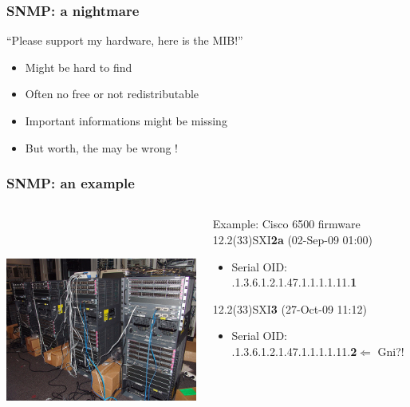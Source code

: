 \documentclass{beamer}
\begin{document}
\begin{frame}
    \frametitle{SNMP: a nightmare}

    \begin{block}{“Please support my hardware, here is the MIB!”}

    \pause
    \begin{itemize}
    \item Might be hard to find
    \item Often no free or not redistributable 
    \item Important informations might be missing
    \item But worth, the may be wrong !
    \end{itemize}
    \end{block}

\end{frame}
\begin{frame}
    \frametitle{SNMP: an example}

 \begin{columns}
 \begin{column}{0.35\textwidth}
         \includegraphics[height=7.5cm]{./pics/cisco.jpg}
 \end{column}
 \begin{column}{0.65\textwidth}
    \begin{block}{Example: Cisco 6500 firmware}
    12.2(33)SXI\textbf{2a} (02-Sep-09 01:00)
    \begin{itemize}
    \item Serial OID: .1.3.6.1.2.1.47.1.1.1.1.11.\textbf{1}
    \end{itemize}
    12.2(33)SXI\textbf{3} (27-Oct-09 11:12)
    \begin{itemize}
    \item Serial OID: .1.3.6.1.2.1.47.1.1.1.1.11.\textbf{2}$\Longleftarrow$ Gni?!
    \end{itemize}
    \end{block}

 \end{column}
\end{columns}


    
\end{frame}
\end{document}
